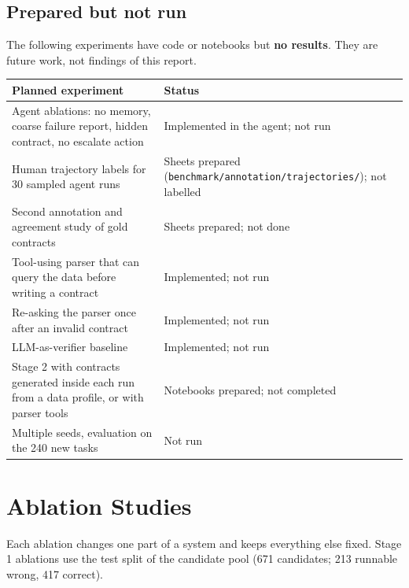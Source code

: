 \documentclass[11pt]{article}
\begin{document}
\subsection{Prepared but not run}

The following experiments have code or notebooks but \textbf{no
results}. They are future work, not findings of this report.

\begin{table}[!tp]
\centering\footnotesize\setlength{\tabcolsep}{3pt}\renewcommand{\arraystretch}{1.1}
\begin{tabularx}{\textwidth}{>{\raggedright\arraybackslash}X>{\raggedright\arraybackslash}X}
\toprule
\textbf{Planned experiment} & \textbf{Status} \\
\midrule
Agent ablations: no memory, coarse failure report, hidden contract, no escalate action & Implemented in the agent; not run \\
Human trajectory labels for 30 sampled agent runs & Sheets prepared (\texttt{benchmark/\allowbreak{}annotation/\allowbreak{}trajectories/\allowbreak{}}); not labelled \\
Second annotation and agreement study of gold contracts & Sheets prepared; not done \\
Tool-using parser that can query the data before writing a contract & Implemented; not run \\
Re-asking the parser once after an invalid contract & Implemented; not run \\
LLM-as-verifier baseline & Implemented; not run \\
Stage 2 with contracts generated inside each run from a data profile, or with parser tools & Notebooks prepared; not completed \\
Multiple seeds, evaluation on the 240 new tasks & Not run \\
\bottomrule
\end{tabularx}
\end{table}

\section{Ablation Studies}

Each ablation changes one part of a system and keeps everything else
fixed. Stage 1 ablations use the test split of the candidate pool (671
candidates; 213 runnable wrong, 417 correct).
\end{document}
